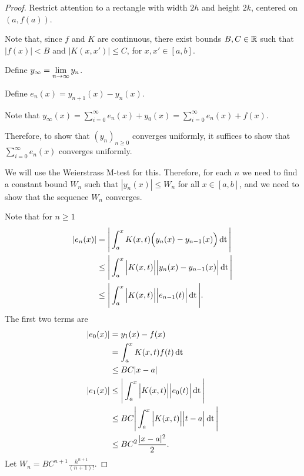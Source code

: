 \documentclass[12pt]{article}
\begin{document}
\begin{proof}
Restrict attention to a rectangle with width $2h$ and height $2k$, centered
on $(a, f(a))$.

Note that, since $f$ and $K$ are continuous, there exist bounds $B, C \in \mathbb{R}$
such that $\Big|f(x)\Big| < B$ and $\Big|K(x, x')\Big| \leq C$, for
$x, x' \in [a,b]$.

Define $y_\infty = \lim\limits_{n \to \infty} y_n$.

Define $e_n(x) = y_{n+1}(x) - y_n(x)$.

Note that $y_\infty(x) = \sum_{i=0}^\infty e_n(x) + y_0(x) = \sum_{i=0}^\infty e_n(x) + f(x)$.

Therefore, to show that $(y_n)_{n\geq 0}$ converges uniformly, it suffices to
show that $\sum_{i=0}^\infty e_n(x)$ converges uniformly.

We will use the Weierstrass M-test for this. Therefore, for each $n$ we need to
find a constant bound $W_n$ such that $|y_n(x)| \leq W_n$ for all
$x \in [a,b]$, and we need to show that the sequence $W_n$ converges.

Note that for $n \geq 1$
\begin{align*}
  |e_n(x)| &   = \Bigg|\int_a^x K(x, t) \Big(y_n(x) - y_{n-1}(x)\Big)\operatorname{\text{dt}}\Bigg|\\
           &\leq \Bigg|\int_a^x \Big|K(x, t)\Big| \Big|y_n(x) - y_{n-1}(x)\Big|\operatorname{\text{dt}}\Bigg|\\
           &\leq \Bigg|\int_a^x \Big|K(x, t)\Big| \Big|e_{n-1}(t)\Big|\operatorname{\text{dt}}\Bigg|.
\end{align*}
The first two terms are
\begin{align*}
  |e_0(x)| &=    y_1(x) - f(x)\\
           &=    \int_a^x K(x, t) f(t)\operatorname{\text{dt}}\\
           &\leq BC|x - a|\\
  |e_1(x)| &\leq \Bigg|\int_a^x \Big|K(x, t)\Big| \Big|e_0(t)\Big|\operatorname{\text{dt}}\Bigg|\\
           &\leq BC\Bigg|\int_a^x \Big|K(x, t)\Big| \Big|t - a\Big| \operatorname{\text{dt}}\Bigg|\\
           &\leq BC^2\frac{|x - a|^2}{2}.
\end{align*}
Let $W_n = BC^{n+1}\frac{h^{n+1}}{(n+1)!}$.


\end{proof}
\end{document}
